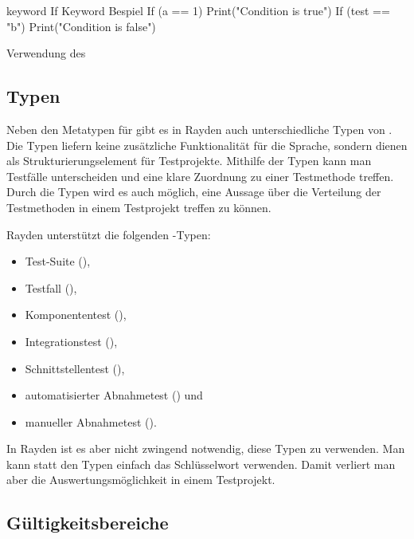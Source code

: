 \begin{program}
\begin{JavaCode}
keyword If Keyword Bespiel {
	If (a == 1) {
		Print("Condition is true")
	}
	If (test == "b") {
		Print("Condition is false")
	}
}
\end{JavaCode}
\caption{Verwendung des }
\label{prog:ifKeywordUsage}
\end{program}

\subsection{Typen}
\label{cha:KeywordTypes}

Neben den Metatypen für  gibt es in Rayden auch unterschiedliche Typen von . Die Typen liefern keine zusätzliche Funktionalität für die Sprache, sondern dienen als Strukturierungselement für Testprojekte. Mithilfe der Typen kann man Testfälle unterscheiden und eine klare Zuordnung zu einer Testmethode treffen. Durch die Typen wird es auch möglich, eine Aussage über die Verteilung der Testmethoden in einem Testprojekt treffen zu können. 

\SuperPar
Rayden unterstützt die folgenden -Typen:

\begin{itemize}
\item Test-Suite (),
\item Testfall (),
\item Komponententest (),
\item Integrationstest (),
\item Schnittstellentest (),
\item automatisierter Abnahmetest () und
\item manueller Abnahmetest ().
\end{itemize}

\SuperPar
In Rayden ist es aber nicht zwingend notwendig, diese Typen zu verwenden. Man kann statt den Typen einfach das Schlüsselwort  verwenden. Damit verliert man aber die Auswertungsmöglichkeit in einem Testprojekt. 

\subsection{Gültigkeitsbereiche}
\label{cha:KeywordScope}

